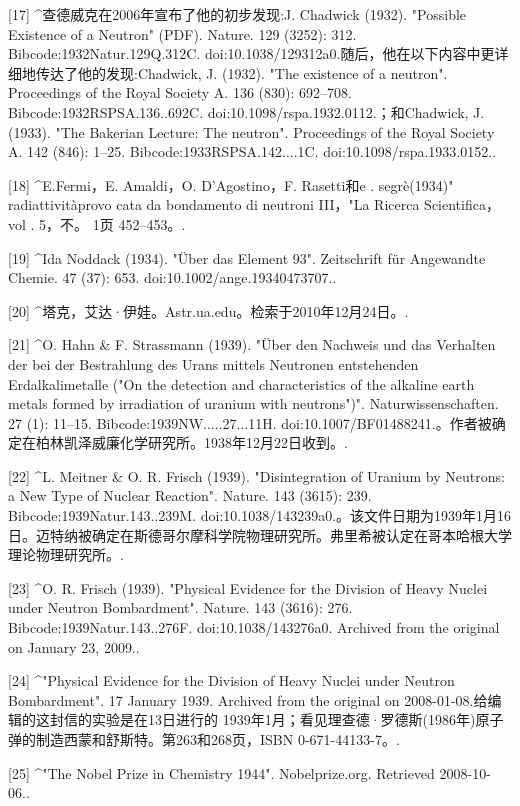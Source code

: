 [17]
^查德威克在2006年宣布了他的初步发现:J. Chadwick (1932). "Possible Existence of a Neutron" (PDF). Nature. 129 (3252): 312. Bibcode:1932Natur.129Q.312C. doi:10.1038/129312a0.随后，他在以下内容中更详细地传达了他的发现:Chadwick, J. (1932). "The existence of a neutron". Proceedings of the Royal Society A. 136 (830): 692–708. Bibcode:1932RSPSA.136..692C. doi:10.1098/rspa.1932.0112.；和Chadwick, J. (1933). "The Bakerian Lecture: The neutron". Proceedings of the Royal Society A. 142 (846): 1–25. Bibcode:1933RSPSA.142....1C. doi:10.1098/rspa.1933.0152..

[18]
^E.Fermi，E. Amaldi，O. D'Agostino，F. Rasetti和e . segrè(1934)" radiattivitàprovo cata da bondamento di neutroni III，"La Ricerca Scientifica，vol . 5，不。 1页 452–453。.

[19]
^Ida Noddack (1934). "Über das Element 93". Zeitschrift für Angewandte Chemie. 47 (37): 653. doi:10.1002/ange.19340473707..

[20]
^塔克，艾达·伊娃。Astr.ua.edu。检索于2010年12月24日。.

[21]
^O. Hahn & F. Strassmann (1939). "Über den Nachweis und das Verhalten der bei der Bestrahlung des Urans mittels Neutronen entstehenden Erdalkalimetalle ("On the detection and characteristics of the alkaline earth metals formed by irradiation of uranium with neutrons")". Naturwissenschaften. 27 (1): 11–15. Bibcode:1939NW.....27...11H. doi:10.1007/BF01488241.。作者被确定在柏林凯泽威廉化学研究所。1938年12月22日收到。.

[22]
^L. Meitner & O. R. Frisch (1939). "Disintegration of Uranium by Neutrons: a New Type of Nuclear Reaction". Nature. 143 (3615): 239. Bibcode:1939Natur.143..239M. doi:10.1038/143239a0.。该文件日期为1939年1月16日。迈特纳被确定在斯德哥尔摩科学院物理研究所。弗里希被认定在哥本哈根大学理论物理研究所。.

[23]
^O. R. Frisch (1939). "Physical Evidence for the Division of Heavy Nuclei under Neutron Bombardment". Nature. 143 (3616): 276. Bibcode:1939Natur.143..276F. doi:10.1038/143276a0. Archived from the original on January 23, 2009..

[24]
^"Physical Evidence for the Division of Heavy Nuclei under Neutron Bombardment". 17 January 1939. Archived from the original on 2008-01-08.给编辑的这封信的实验是在13日进行的 1939年1月；看见理查德·罗德斯(1986年)原子弹的制造西蒙和舒斯特。第263和268页，ISBN 0-671-44133-7。.

[25]
^"The Nobel Prize in Chemistry 1944". Nobelprize.org. Retrieved 2008-10-06..

